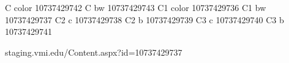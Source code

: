 C  color	10737429742
C  bw			10737429743
C1	color	10737429736
C1	bw		10737429737
C2 	c			10737429738
C2	b			10737429739
C3	c			10737429740
C3	b			10737429741

staging.vmi.edu/Content.aspx?id=10737429737